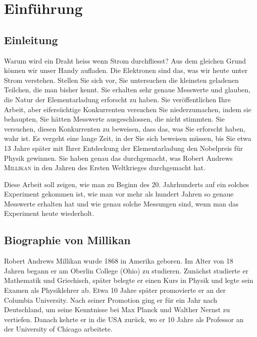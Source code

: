 \chapter{Einführung}\label{ch:einfuerung}
\section{Einleitung}\label{sec:einleitung}
Warum wird ein Draht heiss wenn Strom durchfliesst? Aus dem gleichen Grund können wir unser Handy aufladen. Die Elektronen sind das, was wir heute unter Strom verstehen.  
Stellen Sie sich vor, Sie untersuchen die kleinsten geladenen Teilchen, die man bisher kennt. Sie erhalten sehr genaue Messwerte und glauben, die Natur der Elementarladung erforscht zu haben. Sie veröffentlichen Ihre Arbeit, aber eifersüchtige Konkurrenten versuchen Sie niederzumachen, indem sie behaupten, Sie hätten Messwerte ausgeschlossen, die nicht stimmten. Sie versuchen, diesen Konkurrenten zu beweisen, dass das, was Sie erforscht haben, wahr ist. Es vergeht eine lange Zeit, in der Sie sich beweisen müssen, bis Sie etwa 13 Jahre später mit Ihrer Entdeckung der Elementarladung den Nobelpreis für Physik gewinnen. Sie haben genau das durchgemacht, was Robert Andrews {\scshape Millikan} in den Jahren des Ersten Weltkrieges durchgemacht hat.

Diese Arbeit soll zeigen, wie man zu Beginn des 20. Jahrhunderts auf ein solches Experiment gekommen ist, wie man vor mehr als hundert Jahren so genaue Messwerte erhalten hat und wie genau solche Messungen sind, wenn man das Experiment heute wiederholt.


\section{Biographie von Millikan}\label{sec:autobiographie}
Robert Andrews {\sc Millikan} wurde 1868 in Amerika geboren. Im Alter von 18 Jahren begann er am Oberlin College (Ohio) zu studieren. Zunächst studierte er Mathematik und Griechisch, später belegte er einen Kurs in Physik und legte sein Examen als Physiklehrer ab. Etwa 10 Jahre später promovierte er an der Columbia University. Nach seiner Promotion ging er für ein Jahr nach Deutschland, um seine Kenntnisse bei Max {\sc Planck} und Walther {\sc Nernst} zu vertiefen. Danach kehrte er in die USA zurück, wo er 10 Jahre als Professor an der University of Chicago arbeitete. 

